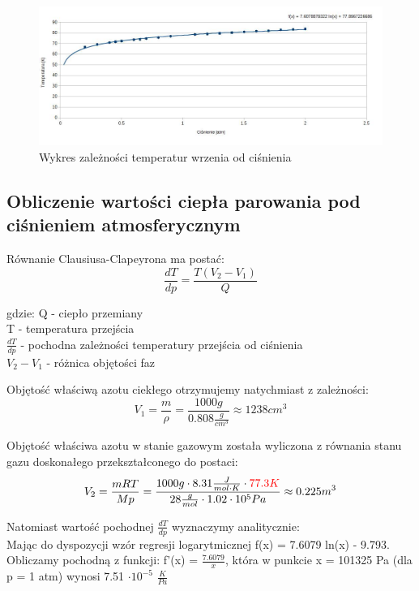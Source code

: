 \documentclass{article}
\begin{document}
\begin{figure}[h!]
\centering
\includegraphics[scale=0.51]{ch01}
\caption{Wykres zależności temperatur wrzenia od ciśnienia}
\end{figure}

\subsection{Obliczenie wartości ciepła parowania pod ciśnieniem atmosferycznym}

Równanie Clausiusa-Clapeyrona ma postać:
\begin{equation}
	\frac{dT}{dp} = \frac{T(V_{2}-V_{1})}{Q}
\end{equation}

gdzie:
Q - ciepło przemiany \\
T - temperatura przejścia \\
$\frac{dT}{dp}$ - pochodna zależności temperatury przejścia od ciśnienia \\ 
$V_{2}-V_{1}$ - różnica objętości faz

Objętość właściwą azotu ciekłego otrzymujemy natychmiast z zależności:
\begin{equation}
	V_1 = \frac{m}{\rho} = \frac{1000 g}{0.808 \frac{g}{cm^3}} \approx 1238 cm^3
\end{equation}

Objętość właściwa azotu w stanie gazowym została wyliczona z równania stanu gazu doskonałego przekształconego do postaci:
\begin{equation}
	V_2 = \frac{mRT}{Mp} = \frac{1000 g \cdot 8.31 \frac{J}{mol \cdot K } \cdot \textcolor{red}{77.3K}}{28 \frac{g}{mol} \cdot 1.02 \cdot 10^5 Pa} \approx 0.225 m^3
\end{equation}

Natomiast wartość pochodnej $\frac{dT}{dp}$ wyznaczymy analitycznie:\\
Mając do dyspozycji wzór regresji logarytmicznej f(x) = 7.6079 ln(x) - 	9.793. Obliczamy pochodną z funkcji: f'(x) = $\frac{7.6079}{x}$, która w punkcie x = 101325 Pa (dla p = 1 atm) wynosi 7.51 $\cdot 10^{-5}$ $\frac{K}{Pa}$
\end{document}
